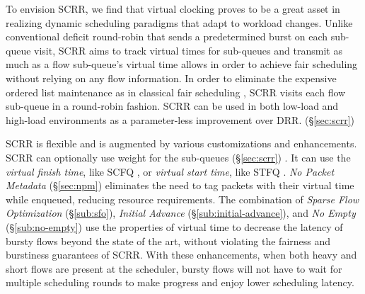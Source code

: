 To envision SCRR, we find that virtual clocking proves to be a great asset in realizing
dynamic scheduling paradigms that adapt to workload changes. Unlike
conventional deficit round-robin that sends a predetermined burst on
each sub-queue visit, SCRR aims to track virtual times for sub-queues
and transmit as much as a flow sub-queue's virtual time allows in
order to achieve fair scheduling without relying on any flow
information. In order to eliminate the expensive ordered list
maintenance as in classical fair scheduling \cite{scfq,stfq}, SCRR
visits each flow sub-queue in a round-robin fashion. SCRR can be used
in both low-load and high-load environments as a parameter-less
improvement over DRR. (\S\ref{sec:scrr})

SCRR is flexible and is augmented by various customizations and
enhancements. SCRR can optionally use weight for the sub-queues
(\S\ref{sec:scrr}) \cite{wfq}. It can use the \textit{virtual finish time}, like
SCFQ \cite{scfq}, or \textit{virtual start time}, like STFQ
\cite{stfq}. \textit{No Packet Metadata} (\S\ref{sec:npm}) eliminates
the need to tag packets with their virtual time while enqueued,
reducing resource requirements. The combination of \textit{Sparse Flow
Optimization} (\S\ref{sub:sfo}), \textit{Initial Advance}
(\S\ref{sub:initial-advance}), and \textit{No Empty}
(\S\ref{sub:no-empty}) use the properties of virtual time to decrease
the latency of bursty flows beyond the state of the art, without
violating the fairness and burstiness guarantees of SCRR. With these
enhancements, when both heavy and short flows are present at the
scheduler, bursty flows will not have to wait for multiple scheduling
rounds to make progress and enjoy lower scheduling latency.




